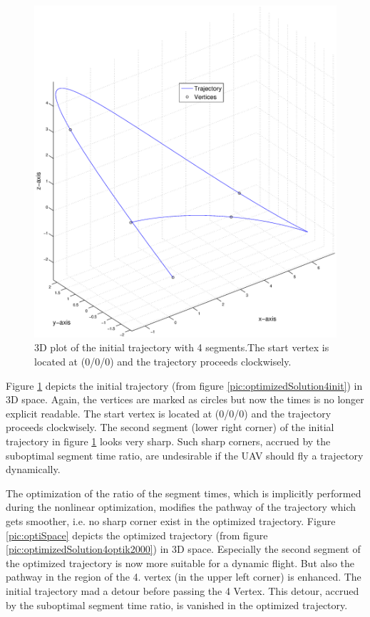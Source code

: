 \begin{figure}[H]
   \centering
   \includegraphics[trim = 36mm 30mm 33mm 30mm,clip,width=1\textwidth]{pics/4SegInitSpace.eps}
   \caption{3D plot of the initial trajectory with 4 segments.The start vertex is located at (0/0/0) and the trajectory proceeds clockwisely.}
   \label{pic:initiSpace} 
\end{figure}


Figure \ref{pic:initiSpace} depicts the initial trajectory (from figure \ref{pic:optimizedSolution4init}) in 3D space. Again, the vertices are marked as circles but now the times is no longer explicit readable. The start vertex is located at (0/0/0) and the trajectory proceeds clockwisely. The second segment (lower right corner) of the initial trajectory in figure \ref{pic:initiSpace} looks very sharp. Such sharp corners, accrued by the suboptimal segment time ratio, are undesirable if the UAV should fly a trajectory dynamically. \newline

The optimization of the ratio of the segment times, which is implicitly performed during the nonlinear optimization, modifies the pathway of the trajectory which gets smoother, i.e. no sharp corner exist in the optimized trajectory.\newline 
Figure \ref{pic:optiSpace} depicts the optimized trajectory (from figure \ref{pic:optimizedSolution4optik2000}) in 3D space. Especially the second segment of the optimized trajectory is now more suitable for a dynamic flight. But also the pathway in the region of the 4. vertex (in the upper left corner) is enhanced. The initial trajectory mad a detour before passing the 4 Vertex. This detour, accrued by the suboptimal segment time ratio, is vanished in the optimized trajectory.



